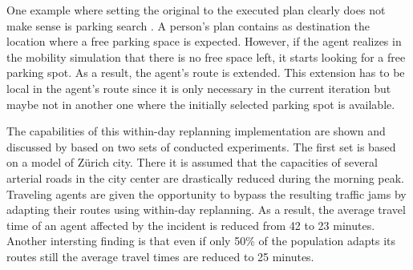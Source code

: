 One example where setting the original to the executed plan clearly does not make sense is parking search 
.
A person's plan contains as destination the location where a free parking space is expected. However, if the agent realizes in the mobility simulation that there is no free space left, it starts looking for a free parking spot. As a result, the agent's route is extended. This extension has to be local in the agent's route since it is only necessary in the current iteration
but maybe not in another one where the initially selected parking spot is available.



The capabilities of this within-day replanning implementation are shown and discussed by \citet{Dobler_PhDThesis_2013} based on two sets of conducted experiments. The first set is based on a model of Zürich city. There it is assumed that the capacities of several arterial roads in the city center are drastically reduced during the morning peak. Traveling agents are given the opportunity to bypass the resulting traffic jams by adapting their routes using within-day replanning. As a result, the average travel time of an agent affected by the incident is reduced from 42 to 23 minutes. Another intersting finding is that even if only 50\% of the population adapts its routes still the average travel times are reduced to 25 minutes.

